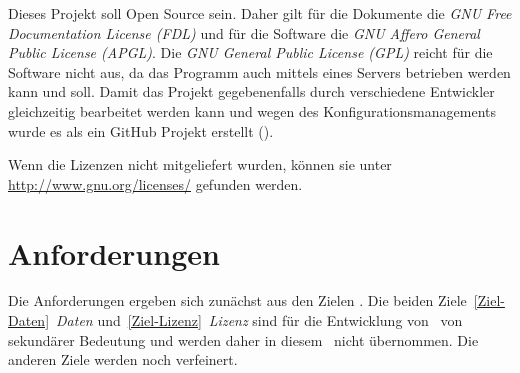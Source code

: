 Dieses Projekt soll Open Source sein.
Daher gilt für die Dokumente die \emph{GNU Free Documentation License (FDL)} und für die Software die \emph{GNU Affero General Public License (APGL)}.
Die \emph{GNU General Public License (GPL)} reicht für die Software nicht aus, da das Programm auch mittels eines Servers betrieben werden kann und soll.
Damit das Projekt gegebenenfalls durch verschiedene Entwickler gleichzeitig bearbeitet werden kann und wegen des Konfigurationsmanagements wurde es als ein GitHub Projekt erstellt ().

Wenn die Lizenzen nicht mitgeliefert wurden, können sie unter \url{http://www.gnu.org/licenses/} gefunden werden.

\section{Anforderungen}%
\label{sec-Anforderungen}

Die Anforderungen ergeben sich zunächst aus den Zielen .
Die beiden Ziele~\ref{Ziel-Daten}~\emph{Daten} und~\ref{Ziel-Lizenz}~\emph{Lizenz} sind für die Entwicklung von \ASBA\ von sekundärer Bedeutung und werden daher in diesem \sectionname\ nicht übernommen.
Die anderen Ziele werden noch verfeinert.

